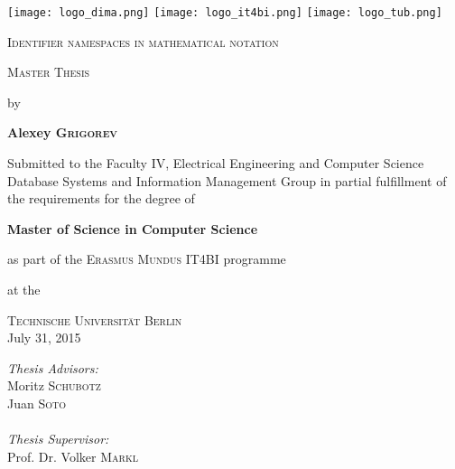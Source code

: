 
\begin{titlepage}
\begin{center}

\texttt{[image: logo\_dima.png]}
\hfill
\texttt{[image: logo\_it4bi.png]}
\hfill
\texttt{[image: logo\_tub.png]}


\vspace*{1.5cm}

\LARGE
\textsc{Identifier namespaces in mathematical notation}

\vspace{1cm}

\Large \textsc{Master Thesis}

\vspace{0.2cm}

by

\vspace{0.4cm}


\textbf{Alexey \textsc{Grigorev}}

\vspace{1.0cm}

\vfill

\large
Submitted to the Faculty IV, Electrical Engineering and Computer Science
Database Systems and Information Management Group
in partial fulfillment of the requirements for the degree of

\textbf{Master of Science in Computer Science}

as part of the \textsc{Erasmus Mundus} IT4BI programme

at the

\textsc{Technische Universit\"{a}t Berlin} \\

July 31, 2015

\vfill

\begin{flushright}
\normalsize
\emph{Thesis Advisors:}\\
Moritz \textsc{Schubotz} \\
Juan \textsc{Soto} \\

\ \\

\emph{Thesis Supervisor:}\\
Prof. Dr. Volker \textsc{Markl}\\
\end{flushright}


\end{center}
\end{titlepage}

